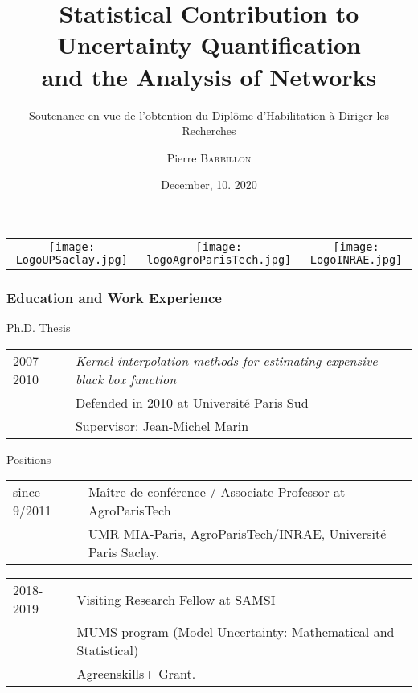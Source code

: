 \documentclass[nopagenumber,9pt]{beamer}
\title[Habilitation Defense]{Statistical Contribution to Uncertainty Quantification\\  and the Analysis of Networks}
\subtitle{Soutenance en vue de l’obtention
du Diplôme d’Habilitation à Diriger les Recherches}
\author[P. Barbillon]{ Pierre \textsc{Barbillon}}
\date{December, 10. 2020}
\begin{document}
\begin{frame}
\titlepage
\vspace{-1cm}
\centering
\begin{tabular}{ccc}
 \texttt{[image: LogoUPSaclay.jpg]}&
  \texttt{[image: logoAgroParisTech.jpg]}&
   \texttt{[image: LogoINRAE.jpg]}
\end{tabular}


\end{frame}



\begin{frame}
 \frametitle{Education and Work Experience}


 
 
 \begin{beamerboxesrounded}{Ph.D. Thesis}
\begin{tabular}[t]{@{}p{.15\linewidth}|p{.8\linewidth}}    
    2007-2010&\textit{Kernel interpolation methods for estimating
expensive black box function}\\
& Defended in 2010 at Université Paris Sud\\
& Supervisor: Jean-Michel Marin
    \end{tabular}\medskip
  
 \end{beamerboxesrounded}

 
 \bigskip
 

 

 \begin{beamerboxesrounded}{Positions}
\begin{tabular}[t]{@{}p{.15\linewidth}|p{.8\linewidth}}    
    since 9/2011&Maître de conférence / Associate Professor at AgroParisTech\\
& UMR MIA-Paris, AgroParisTech/INRAE, Université Paris Saclay.
    \end{tabular}\medskip

  
\begin{tabular}[t]{@{}p{.15\linewidth}|p{.8\linewidth}}    
    2018-2019&Visiting Research Fellow at SAMSI\\
    & MUMS program (Model Uncertainty: Mathematical and Statistical)\\
    & Agreenskills+ Grant.
  \end{tabular}\medskip
 \end{beamerboxesrounded}
  
  
  
  
\end{frame}
\end{document}
